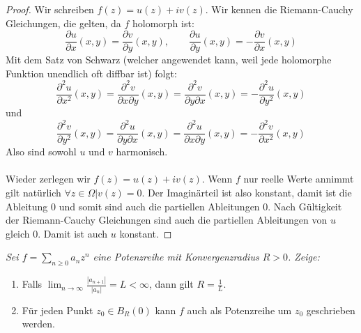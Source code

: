\documentclass[11pt]{article}
\newenvironment{problem}[2][Beispiel]{
    \begin{trivlist}
        \item[\hskip \labelsep {\bfseries #1}\hskip \labelsep {\bfseries #2.}] \itshape}{
    \end{trivlist}\normalshape
}
\begin{document}
    \begin{proof}
        Wir schreiben $f(z) = u(z)+iv(z)$. Wir kennen die Riemann-Cauchy Gleichungen, die gelten, da
        $f$ holomorph ist:
        $$\dfrac{\partial u}{\partial x}(x,y) = \dfrac{\partial v}{\partial y}(x,y), \qquad
        \dfrac{\partial u}{\partial y}(x,y) = -\dfrac{\partial v}{\partial x}(x,y)$$
        Mit dem Satz von Schwarz (welcher angewendet kann, weil jede holomorphe Funktion unendlich oft
        diffbar ist) folgt:
        $$\dfrac{\partial^2 u}{\partial x^2}(x,y)=\dfrac{\partial^2 v}{\partial x\partial y}(x,y)
        = \dfrac{\partial^2 v}{\partial y\partial x}(x,y) = -\dfrac{\partial^2 u}{\partial y^2}(x,y)$$
        und
        $$\dfrac{\partial^2 v}{\partial y^2}(x,y)=\dfrac{\partial^2 u}{\partial y\partial x}(x,y)
        = \dfrac{\partial^2 u}{\partial x\partial y}(x,y) = -\dfrac{\partial^2 v}{\partial x^2}(x,y)$$
        Also sind sowohl $u$ und $v$ harmonisch.\\\\
        Wieder zerlegen wir $f(z) = u(z)+iv(z)$. Wenn $f$ nur reelle Werte annimmt gilt natürlich
        $\forall z\in\Omega| v(z) = 0$. Der Imaginärteil ist also konstant, damit ist die Ableitung
        $0$ und somit sind auch die partiellen Ableitungen $0$. Nach Gültigkeit der Riemann-Cauchy
        Gleichungen sind auch die partiellen Ableitungen von $u$ gleich $0$. Damit ist auch $u$ konstant.
    \end{proof}

    \begin{problem}{5}
        Sei $f=\sum_{n\geq 0}a_n z^n$ eine Potenzreihe mit Konvergenzradius
        $R>0$. Zeige:
        \begin{enumerate}[label=(\alph*)]
            \item Falls $\lim_{n\to\infty}\frac{|a_{n+1}|}{|a_n|}=L<\infty$,
            dann gilt $R=\frac{1}{L}$.
            \item Für jeden Punkt $z_0\in B_R(0)$ kann $f$ auch als Potenzreihe um
            $z_0$ geschrieben werden.
        \end{enumerate}
    \end{problem}
\end{document}
